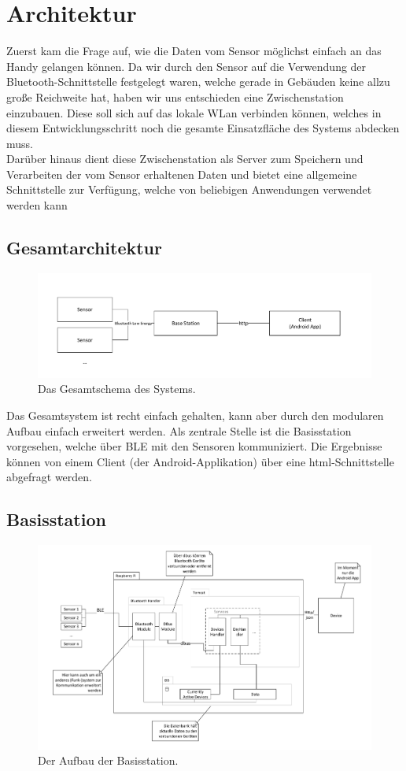 \section{Architektur}
Zuerst kam die Frage auf, wie die Daten vom Sensor möglichst einfach an das Handy gelangen können. Da wir durch den Sensor auf die Verwendung der Bluetooth-Schnittstelle festgelegt waren, welche gerade in Gebäuden keine allzu große Reichweite hat, haben wir uns entschieden eine Zwischenstation einzubauen. Diese soll sich auf das lokale WLan verbinden können, welches in diesem Entwicklungsschritt noch die gesamte Einsatzfläche des Systems abdecken muss. \\
Darüber hinaus dient diese Zwischenstation als Server zum Speichern und Verarbeiten der vom Sensor erhaltenen Daten und bietet eine allgemeine Schnittstelle zur Verfügung, welche von beliebigen Anwendungen verwendet werden kann
\subsection{Gesamtarchitektur}
\begin{figure}[htb] 
	\centerline{\includegraphics[scale=.5]{Architektur/dryR_complete.pdf}}
	\caption{Das Gesamtschema des Systems.}
\end{figure}

Das Gesamtsystem ist recht einfach gehalten, kann aber durch den modularen Aufbau einfach erweitert werden. Als zentrale Stelle ist die Basisstation vorgesehen, welche über BLE mit den Sensoren kommuniziert. Die Ergebnisse können von einem Client (der Android-Applikation) über eine html-Schnittstelle abgefragt werden.
\subsection{Basisstation}
\begin{figure}[htb] 
	\centerline{\includegraphics[scale=.4]{Architektur/BaseStation_v2.pdf} }
	\caption{Der Aufbau der Basisstation.}
\end{figure}

